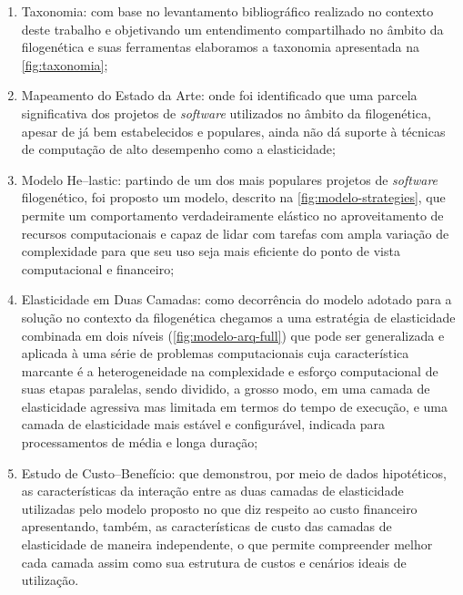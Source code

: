 \documentclass[english,brazilian]{UNISINOSmonografia} %
\begin{document}
\begin{enumerate}[label={\arabic*)}]
	
	\item Taxonomia: com base no levantamento bibliográfico realizado no contexto deste trabalho e objetivando um entendimento compartilhado no âmbito da filogenética e suas ferramentas elaboramos a taxonomia apresentada na \autoref{fig:taxonomia};
	
	
	\item Mapeamento do Estado da Arte: onde foi identificado que uma parcela significativa dos projetos de \textit{software} utilizados no âmbito da filogenética, apesar de já bem estabelecidos e populares, ainda não dá suporte à técnicas de computação de alto desempenho como a elasticidade;
	
	
	\item Modelo \textsf{He}--lastic: partindo de um dos mais populares projetos de \textit{software} filogenético, foi proposto um modelo, descrito na \autoref{fig:modelo-strategies}, que permite um comportamento verdadeiramente elástico no aproveitamento de recursos computacionais e capaz de lidar com tarefas com ampla variação de complexidade para que seu uso seja mais eficiente do ponto de vista computacional e financeiro;
	
	
	\item Elasticidade em Duas Camadas: como decorrência do modelo adotado para a solução no contexto da filogenética chegamos a uma estratégia de elasticidade combinada em dois níveis (\autoref{fig:modelo-arq-full}) que pode ser generalizada e aplicada à uma série de problemas computacionais cuja característica marcante é a heterogeneidade na complexidade e esforço computacional de suas etapas paralelas, sendo dividido, a grosso modo, em uma camada de elasticidade agressiva mas limitada em termos do tempo de execução, e uma camada de elasticidade mais estável e configurável, indicada para processamentos de média e longa duração;
	
	
	\item Estudo de Custo--Benefício: que demonstrou, por meio de dados hipotéticos, as características da interação entre as duas camadas de elasticidade utilizadas pelo modelo proposto no que diz respeito ao custo financeiro apresentando, também, as características de custo das camadas de elasticidade de maneira independente, o que permite compreender melhor cada camada assim como sua estrutura de custos e cenários ideais de utilização.

\end{enumerate}
\end{document}
